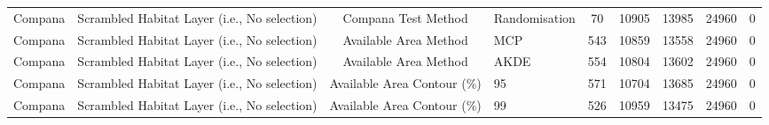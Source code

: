 \documentclass[10pt,a4paper]{article}
\begin{document}
\begin{table}
{\begin{tabular}[t]{lcclcclcc}
Compana & Scrambled Habitat Layer (i.e., No selection) & Compana Test Method & Randomisation & 70 & 10905 & 13985 & 24960 & 0\\
Compana & Scrambled Habitat Layer (i.e., No selection) & Available Area Method & MCP & 543 & 10859 & 13558 & 24960 & 0\\
Compana & Scrambled Habitat Layer (i.e., No selection) & Available Area Method & AKDE & 554 & 10804 & 13602 & 24960 & 0\\
Compana & Scrambled Habitat Layer (i.e., No selection) & Available Area Contour (\%) & 95 & 571 & 10704 & 13685 & 24960 & 0\\
Compana & Scrambled Habitat Layer (i.e., No selection) & Available Area Contour (\%) & 99 & 526 & 10959 & 13475 & 24960 & 0\\

\end{tabular}}
\end{table}
\end{document}
